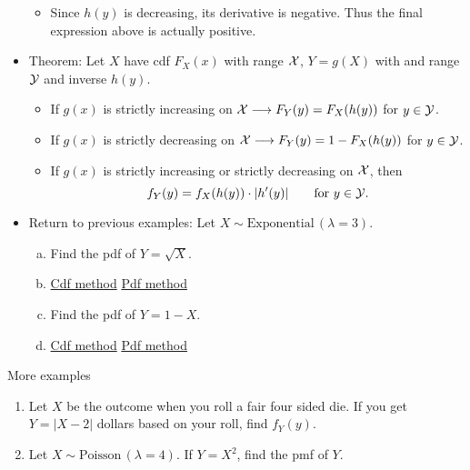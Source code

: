 \documentclass{article}
\newcommand{\follow}[1]{\sim \text{#1}\,}		%
\begin{document}
\begin{itemize}
\begin{itemize}
        \item Since $h(y)$ is decreasing, its derivative is negative. Thus the final expression above is actually positive.
    \end{itemize}
    \item Theorem: Let $X$ have cdf $F_X(x)$ with range ${\cal X}$, $Y = g(X)$ with and range ${\cal Y}$ and inverse $h(y)$.\bigskip
    \begin{itemize}
        \item If $g(x)$ is strictly increasing on ${\cal X} \longrightarrow F_Y(y) = F_X(h(y))$ for $y \in {\cal Y}$.
        \item If $g(x)$ is strictly decreasing on ${\cal X} \longrightarrow F_Y(y) = 1 - F_X(h(y))$ for $y \in {\cal Y}$.\bigskip
        \item If $g(x)$ is strictly increasing or strictly decreasing on ${\cal X}$, then
         \[f_Y(y) = f_X(h(y)) \cdot \lvert h'(y) \rvert \quad\quad \text{for } y \in {\cal Y}.\]
    \end{itemize}
    \item Return to previous examples: Let $X \follow{Exponential}(\lambda = 3)$.
    \begin{enumerate}[(a)]
        \item Find the pdf of $Y = \sqrt{X}$.
        \item[] \ul{Cdf method} \hspace{200pt} \ul{Pdf method}\vspace{200pt}
        \item Find the pdf of $Y = 1 - X$.
        \item[] \ul{Cdf method} \hspace{200pt} \ul{Pdf method}\vspace{200pt}
    \end{enumerate}
\end{itemize}\bigskip

More examples\bigskip
\begin{enumerate}
    \item Let $X$ be the outcome when you roll a fair four sided die. If you get $Y = \lvert X - 2 \rvert$ dollars based on your roll, find $f_Y(y)$.\vspace{150pt}
    \item Let $X \follow{Poisson}(\lambda = 4)$. If $Y = X^2$, find the pmf of $Y$.\vspace{200pt}
\end{enumerate}
\end{document}
